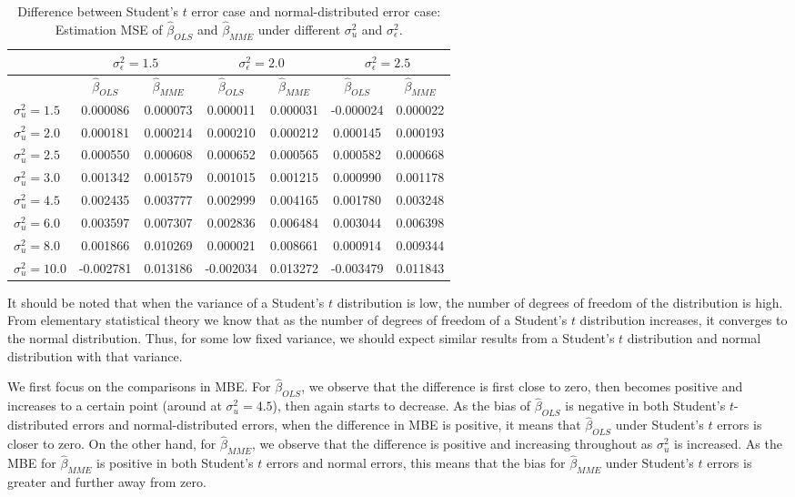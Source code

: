 \documentclass{article}
\begin{document}
\begin{table}[ht]
    \centering
    \caption{Difference between Student's $t$ error case and normal-distributed error case: Estimation MSE of $\hat{\beta}_{OLS}$ and $\hat{\beta}_{MME}$ under different $\sigma^2_u$ and $\sigma^2_\epsilon$.}
    \label{Tab:MSE_diff_t_normal}
    \begin{tabular}[t]{lcccccc}
        \hline
        &\multicolumn{2}{c}{$\sigma^2_\epsilon=1.5$}&\multicolumn{2}{c}{$\sigma^2_\epsilon=2.0$}&\multicolumn{2}{c}{$\sigma^2_\epsilon=2.5$}\\
        \hline
        &$\hat{\beta}_{OLS}$&$\hat{\beta}_{MME}$&$\hat{\beta}_{OLS}$&$\hat{\beta}_{MME}$&$\hat{\beta}_{OLS}$&$\hat{\beta}_{MME}$\\
        \hline
        $\sigma^2_u = 1.5$&0.000086&0.000073&0.000011&0.000031&-0.000024&0.000022\\
        $\sigma^2_u = 2.0$&0.000181&0.000214&0.000210&0.000212&0.000145&0.000193\\
        $\sigma^2_u = 2.5$&0.000550&0.000608&0.000652&0.000565&0.000582&0.000668\\
        $\sigma^2_u = 3.0$&0.001342&0.001579&0.001015&0.001215&0.000990&0.001178\\
        $\sigma^2_u = 4.5$&0.002435&0.003777&0.002999&0.004165&0.001780&0.003248\\
        $\sigma^2_u = 6.0$&0.003597&0.007307&0.002836&0.006484&0.003044&0.006398\\
        $\sigma^2_u = 8.0$&0.001866&0.010269&0.000021&0.008661&0.000914&0.009344\\
        $\sigma^2_u = 10.0$&-0.002781&0.013186&-0.002034&0.013272&-0.003479&0.011843\\
        \hline
    \end{tabular}
\end{table}

It should be noted that when the variance of a Student's $t$ distribution is low, the number of degrees of freedom of the distribution is high. 
From elementary statistical theory we know that as the number of degrees of freedom of a Student's $t$ distribution increases, it converges to the normal distribution.
Thus, for some low fixed variance, we should expect similar results from a Student's $t$ distribution and normal distribution with that variance.

We first focus on the comparisons in MBE.
For $\hat{\beta}_{OLS}$, we observe that the difference is first close to zero, then becomes positive and increases to a certain point (around at $\sigma^2_u = 4.5$), then again starts to decrease.
As the bias of $\hat{\beta}_{OLS}$ is negative in both Student's $t$-distributed errors and normal-distributed errors,
when the difference in MBE is positive, it means that $\hat{\beta}_{OLS}$ under Student's $t$ errors is closer to zero.
On the other hand, for $\hat{\beta}_{MME}$, we observe that the difference is positive and increasing throughout as $\sigma^2_u$ is increased.
As the MBE for $\hat{\beta}_{MME}$ is positive in both Student's $t$ errors and normal errors, this means that the bias for $\hat{\beta}_{MME}$ under Student's $t$ errors is greater and further away from zero.
\end{document}
